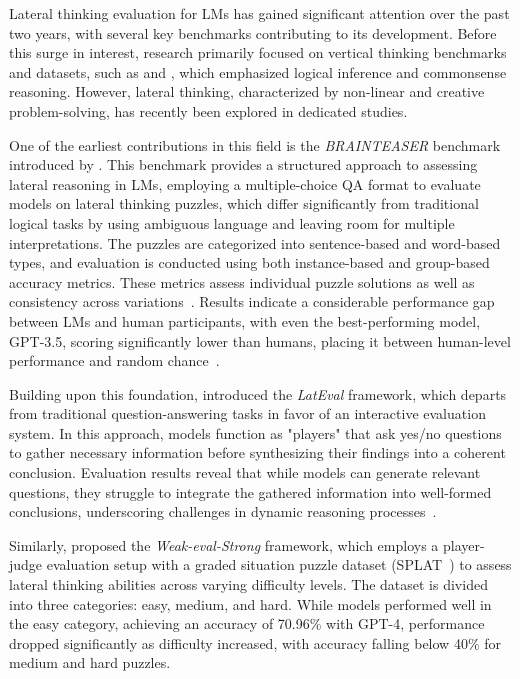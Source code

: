 Lateral thinking evaluation for \acp{LM} has gained significant attention over the past two years, with several key benchmarks contributing to its development. Before this surge in interest, research primarily focused on vertical thinking benchmarks and datasets, such as  and , which emphasized logical inference and commonsense reasoning. However, lateral thinking, characterized by non-linear and creative problem-solving, has recently been explored in dedicated studies.

One of the earliest contributions in this field is the \textit{BRAINTEASER} benchmark introduced by \textcite{jiangBRAINTEASERLateralThinking2023}. This benchmark provides a structured approach to assessing lateral reasoning in \acp{LM}, employing a multiple-choice \ac{QA} format to evaluate models on lateral thinking puzzles, which differ significantly from traditional logical tasks by using ambiguous language and leaving room for multiple interpretations. The puzzles are categorized into sentence-based and word-based types, and evaluation is conducted using both instance-based and group-based accuracy metrics. These metrics assess individual puzzle solutions as well as consistency across variations~\cite{jiangBRAINTEASERLateralThinking2023}. Results indicate a considerable performance gap between \acp{LM} and human participants, with even the best-performing model, \ac{GPT}-3.5, scoring significantly lower than humans, placing it between human-level performance and random chance~\cite{jiangBRAINTEASERLateralThinking2023}.

Building upon this foundation, \textcite{huangLatEvalInteractiveLLMs2024} introduced the \textit{LatEval} framework, which departs from traditional question-answering tasks in favor of an interactive evaluation system. In this approach, models function as "players" that ask yes/no questions to gather necessary information before synthesizing their findings into a coherent conclusion. Evaluation results reveal that while models can generate relevant questions, they struggle to integrate the gathered information into well-formed conclusions, underscoring challenges in dynamic reasoning processes~\cite{huangLatEvalInteractiveLLMs2024}.

Similarly, \textcite{chenWeakevalStrongEvaluatingEliciting2024} proposed the \textit{Weak-eval-Strong} framework, which employs a player-judge evaluation setup with a graded situation puzzle dataset (SPLAT~\cite{chenWeakevalStrongEvaluatingEliciting2024}) to assess lateral thinking abilities across varying difficulty levels. The dataset is divided into three categories: easy, medium, and hard. While models performed well in the easy category, achieving an accuracy of 70.96\% with \ac{GPT}-4, performance dropped significantly as difficulty increased, with accuracy falling below 40\% for medium and hard puzzles.

